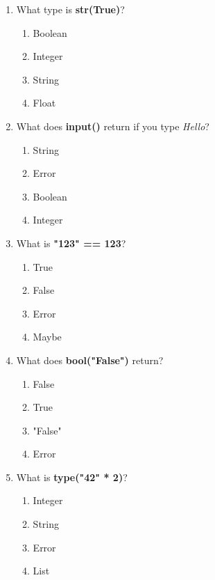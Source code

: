 \documentclass{article}
\begin{document}
\begin{multicols*}{4}
\begin{enumerate}
        \item What type is \textbf{str(True)}?
        \begin{enumerate}[label=(\Alph*)]
            \item Boolean
            \item Integer
            \item String
            \item Float
        \end{enumerate} 

        \item What does \textbf{input()} return if you type \textit{Hello}?
        \begin{enumerate}[label=(\Alph*)]
            \item String
            \item Error
            \item Boolean
            \item Integer
        \end{enumerate}

        \item What is \textbf{"123" == 123}?
        \begin{enumerate}[label=(\Alph*)]
            \item True
            \item False
            \item Error
            \item Maybe
        \end{enumerate}

        \item What does \textbf{bool("False")} return?
        \begin{enumerate}[label=(\Alph*)]
            \item False
            \item True
            \item "False"
            \item Error
        \end{enumerate}

        \item What is \textbf{type("42" * 2)}?
        \begin{enumerate}[label=(\Alph*)]
            \item Integer
            \item String
            \item Error
            \item List
        \end{enumerate}


\end{enumerate}
\end{multicols*}
\end{document}
